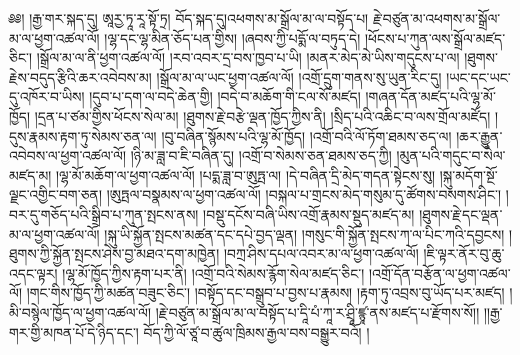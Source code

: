 \setcounter{footnote}{0} 
༅༅། །རྒྱ་གར་སྐད་དུ། ཨཱརྱ་ཏཱ་རཱ་སྟོ་ཏྲ། བོད་སྐད་དུ།འཕགས་མ་སྒྲོལ་མ་ལ་བསྟོད་པ། རྗེ་བཙུན་མ་འཕགས་མ་སྒྲོལ་མ་ལ་ཕྱག་འཚལ་ལོ། །ལྷ་དང་ལྷ་མིན་ཅོད་པན་གྱིས། །ཞབས་ཀྱི་པདྨོ་ལ་བཏུད་དེ། །ཕོངས་པ་ཀུན་ལས་སྒྲོལ་མཛད་ཅིང་། །སྒྲོལ་མ་ལ་ནི་ཕྱག་འཚལ་ལོ། །རབ་འབར་དྲ་བས་ཁྱབ་པ་ཡི། །མནར་མེད་མེ་ཡིས་གདུངས་པ་ལ། །ཐུགས་རྗེས་བདུད་རྩིའི་ཆར་འབེབས་མ། །སྒྲོལ་མ་ལ་ཡང་ཕྱག་འཚལ་ལོ། །འགྲོ་དྲུག་གནས་སུ་ཡུན་རིང་དུ། །ཡང་དང་ཡང་དུ་འཁོར་བ་ཡིས། །དུབ་པ་དག་ལ་བདེ་ཆེན་གྱི། །བདེ་བ་མཆོག་གི་ངལ་སོ་མཛད། །གཞན་དོན་མཛད་པའི་ལྷ་མོ་ཁྱོད། །དྲན་པ་ཙམ་གྱིས་ཕོངས་སེལ་མ། །ཐུགས་རྗེ་བརྩེ་ལྡན་ཁྱོད་ཀྱིས་ནི། །སྲིད་པའི་འཆིང་བ་ལས་གྲོལ་མཛོད། །དུས་རྣམས་རྟག་ཏུ་སེམས་ཅན་ལ། །བུ་བཞིན་སྙོམས་པའི་ལྷ་མོ་ཁྱོད། །འགྲོ་བའི་ལོ་ཏོག་ཐམས་ཅད་ལ། །ཆར་རྒྱུན་འབེབས་ལ་ཕྱག་འཚལ་ལོ། །ཉི་མ་ཟླ་བ་ཇི་བཞིན་དུ། །འགྲོ་བ་སེམས་ཅན་ཐམས་ཅད་ཀྱི། །མུན་པའི་གདུང་བ་སེལ་མཛད་མ། །ལྷ་མོ་མཆོག་ལ་ཕྱག་འཚལ་ལོ། །པདྨ་ཟླ་བ་ཨུཏྤ་ལ། །དེ་བཞིན་དྲི་མེད་གདན་སྟེངས་སུ། །སྐུ་མདོག་སྔོ་ལྗང་འགྱིང་བག་ཅན། །ཨུཏྤལ་བསྣམས་ལ་ཕྱག་འཚལ་ལོ། །བསྐལ་པ་གྲངས་མེད་གསུམ་དུ་ཚོགས་བསགས་ཤིང་། །བར་དུ་གཅོད་པའི་སྒྲིབ་པ་ཀུན་སྤངས་ནས། །བསྡུ་དངོས་བཞི་ཡིས་འགྲོ་རྣམས་སྡུད་མཛད་མ། །ཐུགས་རྗེ་དང་ལྡན་མ་ལ་ཕྱག་འཚལ་ལོ། །སྐུ་ཡི་སྐྱོན་སྤངས་མཚན་དང་དཔེ་བྱད་ལྡན། །གསུང་གི་སྐྱོན་སྤངས་ཀ་ལ་པིང་ཀའི་དབྱངས། །ཐུགས་ཀྱི་སྐྱོན་སྤངས་ཤེས་བྱ་མཐའ་དག་མཁྱེན། །བཀྲ་ཤིས་དཔལ་འབར་མ་ལ་ཕྱག་འཚལ་ལོ། །ཇི་ལྟར་ནོར་བུ་ཆུ་འདང་ལྟར། །ལྷ་མོ་ཁྱོད་ཀྱིས་རྟག་པར་ནི། །འགྲོ་བའི་སེམས་རྙོག་སེལ་མཛད་ཅིང་། །འགྲོ་དོན་བརྩོན་ལ་ཕྱག་འཚལ་ལོ། །གང་གིས་ཁྱོད་ཀྱི་མཚན་བཟུང་ཅིང་། །བསྟོད་དང་བསྒྲུབ་པ་བྱས་པ་རྣམས། །རྟག་ཏུ་འབྲས་བུ་ཡོད་པར་མཛད། །མི་བསྙེལ་ཁྱོད་ལ་ཕྱག་འཚལ་ལོ། །རྗེ་བཙུན་མ་སྒྲོལ་མ་ལ་བསྟོད་པ་དཱི་པཾ་ཀཱ་ར་ཤྲཱི་ཛྙཱ་ནས་མཛད་པ་རྫོགས་སོ།། །།རྒྱ་གར་གྱི་མཁན་པོ་དེ་ཉིད་དང་། བོད་ཀྱི་ལོ་ཙཱ་བ་ཚུལ་ཁྲིམས་རྒྱལ་བས་བསྒྱུར་བའོ། །